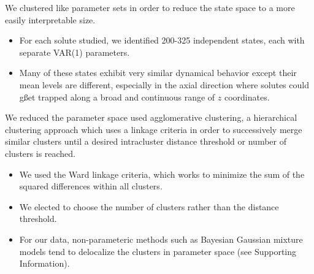 \documentclass{article}
\begin{document}
  We clustered like parameter sets in order to reduce the state space to
  a more easily interpretable size.
  \begin{itemize}
  	\item For each solute studied, we identified 200-325 independent states, each
   	with separate VAR(1) parameters.
   	\item Many of these states exhibit very similar dynamical behavior except their
   	mean levels are different, especially in the axial direction where solutes could
   	gßet trapped along a broad and continuous range of $z$ coordinates. 
  \end{itemize}
  
  We reduced the parameter space used agglomerative clustering, a hierarchical
  clustering approach which uses a linkage criteria in order to successively merge
  similar clusters until a desired intracluster distance threshold or number of
  clusters is reached. 
  \begin{itemize}
   	\item We used the Ward linkage criteria, which works to minimize the sum of
   	the squared differences within all clusters.
   	\item We elected to choose the number of clusters rather than the distance
   	threshold.
   	\item For our data, non-parameteric methods such as Bayesian Gaussian mixture
   	models tend to delocalize the clusters in parameter space (see Supporting
   	Information).
  \end{itemize}  
  
\end{document}
